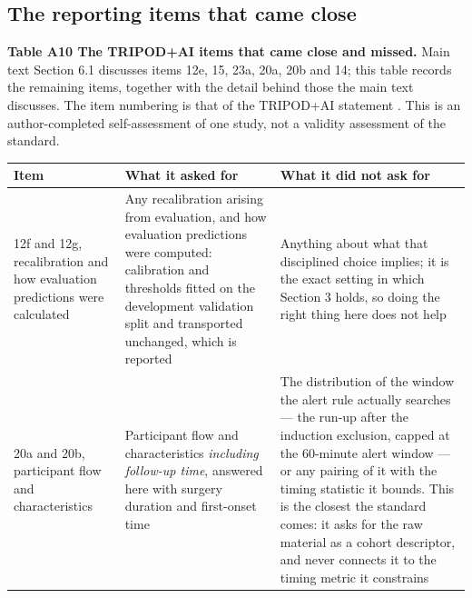 \subsection{The reporting items that came close}\label{the-reporting-items-that-came-close}

\begin{minipage}{\linewidth}
\textbf{Table A10 \textbar{} The TRIPOD+AI items that came close and missed.} Main text Section 6.1 discusses items 12e, 15, 23a, 20a, 20b and 14; this table records the remaining items, together with the detail behind those the main text discusses. The item numbering is that of the TRIPOD+AI statement
\citep{collins2024tripodai}. This is an author-completed self-assessment of one study, not a validity
assessment of the standard.

\vspace{0.5em}
\centering\footnotesize
\begin{tabular}{@{}
  >{\raggedright\arraybackslash}p{}
  >{\raggedright\arraybackslash}p{}
  >{\raggedright\arraybackslash}p{}@{}}
\toprule\noalign{}
\begin{minipage}[b]{\linewidth}\raggedright
Item
\end{minipage} & \begin{minipage}[b]{\linewidth}\raggedright
What it asked for
\end{minipage} & \begin{minipage}[b]{\linewidth}\raggedright
What it did not ask for
\end{minipage} \\
\midrule\noalign{}
\bottomrule\noalign{}
12f and 12g, recalibration and how evaluation predictions were calculated & Any recalibration arising from evaluation, and how evaluation predictions were computed: calibration and thresholds fitted on the development validation split and transported unchanged, which is reported & Anything about what that disciplined choice implies; it is the exact setting in which Section 3 holds, so doing the right thing here does not help \\
20a and 20b, participant flow and characteristics & Participant flow and characteristics \emph{including follow-up time}, answered here with surgery duration and first-onset time & The distribution of the window the alert rule actually searches --- the run-up after the induction exclusion, capped at the 60-minute alert window --- or any pairing of it with the timing statistic it bounds. This is the closest the standard comes: it asks for the raw material as a cohort descriptor, and never connects it to the timing metric it constrains \\

\end{tabular}
\end{minipage}
